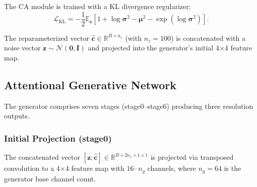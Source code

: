 \documentclass[conference]{IEEEtran}
\begin{document}
The CA module is trained with a KL divergence regularizer:
\begin{equation}
    \mathcal{L}_{\text{KL}} = -\frac{1}{2} \mathbb{E}_{\mathbf{s}} \left[ 1 + \log \boldsymbol{\sigma}^2 - \boldsymbol{\mu}^2 - \exp(\log \boldsymbol{\sigma}^2) \right].
\end{equation}

The reparameterized vector $\hat{\mathbf{c}} \in \mathbb{R}^{B \times n_z}$ (with $n_z=100$) is concatenated with a noise vector $\mathbf{z} \sim \mathcal{N}(\mathbf{0}, \mathbf{I})$ and projected into the generator's initial 4$\times$4 feature map.

\subsection{Attentional Generative Network}
\label{sec:generator}

The generator comprises seven stages (stage0--stage6) producing three resolution outputs.

\subsubsection{Initial Projection (stage0)}
The concatenated vector $[\mathbf{z}; \hat{\mathbf{c}}] \in \mathbb{R}^{B \times 2n_z \times 1 \times 1}$ is projected via transposed convolution to a 4$\times$4 feature map with $16 \cdot n_g$ channels, where $n_g=64$ is the generator base channel count.
\end{document}

